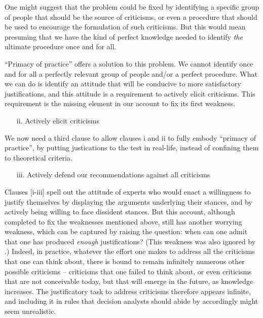 \documentclass[preprint, french, english, 11pt, authoryear]{elsarticle}%
\begin{document}
One might suggest that the problem could be fixed by identifying a specific group of people that should be the source of criticisms, or even a procedure that should be used to encourage the formulation of such criticisms. But this would mean presuming that we have the kind of perfect knowledge needed to identify \emph{the} ultimate procedure once and for all.

``Primacy of practice” offers a solution to this problem. We cannot identify once and for all a perfectly relevant group of people and/or a perfect procedure. What we can do is identify an attitude that will be conducive to more satisfactory justifications, and this attitude is a requirement to actively elicit criticisms. This requirement is the missing element in our account to fix its first weakness.

\begin{itemize}
\item[ii.]	Actively elicit criticisms
\end{itemize}

We now need a third clause to allow clauses i and ii to fully embody “primacy of practice”, by putting justications to the test in real-life, instead of confining them to theoretical criteria.

\begin{itemize}
\item[iii.]	 Actively defend our recommendations against all criticisms
\end{itemize}

Clauses [i-iii] spell out the attitude of experts who would enact a willingness to justify themselves by displaying the arguments underlying their stances, and by actively being willing to face dissident stances. But this account, although completed to fix the weaknesses mentioned above, still has another worrying weakness, which can be captured by raising the question: when can one admit that one has produced \emph{enough} justifications? (This weakness was also ignored by  \citet{meinard_what_2017}.) Indeed, in practice, whatever the effort one makes to address all the criticisms that one can think about, there is bound to remain infinitely numerous other possible criticisms -- criticisms that one failed to think about, or even criticisms that are not conceivable today, but that will emerge in the future, as knowledge increases. The justificatory task to address criticisms therefore appears infinite, and including it in rules that decision analysts should abide by accordingly might seem unrealistic.
\end{document}

